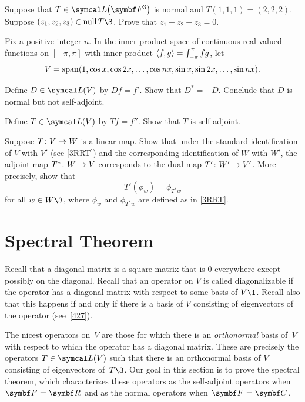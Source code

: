 \begin{exercises}

\exercise
Suppose that $T \in \L\paren[\big]{\F{3}}$ is normal and $T(1,1,1) = (2,2,2)$. Suppose $(z_1, z_2, z_3) \in \ker T\3$. Prove that
$
z_1 + z_2 + z_3 = 0$.


\exercise
Fix a positive integer $n$. In the inner product space of
continuous real-valued functions on $[-\pi,\pi]$ with inner product
$
\langle f, g\rangle = \int_{-\pi}^{\pi} fg$,
let \label{1100}
\[ \addtolength{\belowdisplayskip}{-3bp}
V = \Span( 1, \cos x, \cos 2x, \dots, \cos nx, \sin x, \sin 2x, \dots, \sin nx).
\]
\begin{subtheorem}
\item
Define $D \in \L(V)$ by $Df = f'\!$. Show that $D^* = -D$. Conclude that $D$ is normal but not self-adjoint.
\item
Define $T \in \L(V)$ by $Tf = f''\!$. Show that $T$ is self-adjoint.
\end{subtheorem}
\exercisesubtheoremend


\exercise
Suppose $T \colon V \to W$ is a linear map. Show that under the standard identification of $V$ with $V'$ (see \ref{3RRT}) and the corresponding identification of $W$ with $W'\!$, the adjoint map $T^* \colon W \to V$ corresponds to the dual map $T' \colon W' \to V'$. More precisely, show that
\[
T' \! (\phi_w) = \phi_{T^* w}
\]
for all $w \in W\3$, where $\phi_w$ and $\phi_{T^* w}$  are defined as in \ref{3RRT}. \label{IdentifyTstarTprime}


\end{exercises}

\CrCom

\section{Spectral Theorem} \label{SpectralTheorem}

Recall that a diagonal matrix is a square matrix that is $0$ everywhere except possibly on the diagonal.  Recall that an operator on $V$ is called diagonalizable if the operator has a diagonal matrix with respect to some basis of $V\1$. Recall also that this happens if and only if there is a basis of $V$ consisting of eigenvectors of the operator (see~\ref{427}).

The nicest operators on~$V$ are those for which there is an \textit{orthonormal} basis of~$V$ with respect to which the operator has a diagonal matrix.  These are precisely the operators $T \in \L(V)$ such that there is an orthonormal basis of $V$ consisting of eigenvectors of~$T\3$.  Our goal in this section is to prove the spectral theorem, which characterizes these operators as the self-adjoint operators when $\F{} = \R{}$ and as the normal operators when $\F{} = \C{}$.


